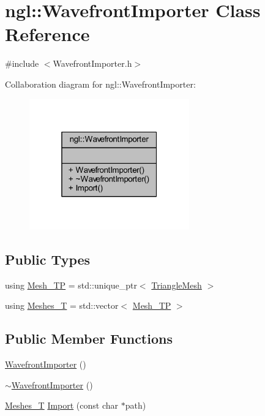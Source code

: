 \hypertarget{classngl_1_1_wavefront_importer}{}\section{ngl\+:\+:Wavefront\+Importer Class Reference}
\label{classngl_1_1_wavefront_importer}


{\ttfamily \#include $<$Wavefront\+Importer.\+h$>$}



Collaboration diagram for ngl\+:\+:Wavefront\+Importer\+:
\nopagebreak
\begin{figure}[H]
\begin{center}
\leavevmode
\includegraphics[width=196pt]{classngl_1_1_wavefront_importer__coll__graph}
\end{center}
\end{figure}
\subsection*{Public Types}
\begin{DoxyCompactItemize}
\item 
using \mbox{\hyperlink{classngl_1_1_wavefront_importer_a7b6341a4a93f9bc894c7d91b46213a74}{Mesh\+\_\+\+TP}} = std\+::unique\+\_\+ptr$<$ \mbox{\hyperlink{classngl_1_1_triangle_mesh}{Triangle\+Mesh}} $>$
\item 
using \mbox{\hyperlink{classngl_1_1_wavefront_importer_aaddcb6ac6e44cc79d8fe986cf7645443}{Meshes\+\_\+T}} = std\+::vector$<$ \mbox{\hyperlink{classngl_1_1_wavefront_importer_a7b6341a4a93f9bc894c7d91b46213a74}{Mesh\+\_\+\+TP}} $>$
\end{DoxyCompactItemize}
\subsection*{Public Member Functions}
\begin{DoxyCompactItemize}
\item 
\mbox{\hyperlink{classngl_1_1_wavefront_importer_a43c0ae1bcfda1f823bbc3490ceba2a00}{Wavefront\+Importer}} ()
\item 
\mbox{\hyperlink{classngl_1_1_wavefront_importer_aace3551746ca3775d726e9de7c9eb95e}{$\sim$\+Wavefront\+Importer}} ()
\item 
\mbox{\hyperlink{classngl_1_1_wavefront_importer_aaddcb6ac6e44cc79d8fe986cf7645443}{Meshes\+\_\+T}} \mbox{\hyperlink{classngl_1_1_wavefront_importer_a4a5a54c6fadc2c60a15301790ccdd0ed}{Import}} (const char $\ast$path)
\end{DoxyCompactItemize}


